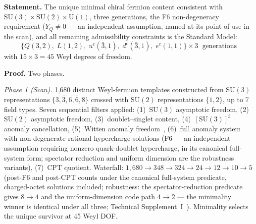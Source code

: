 \documentclass[11pt]{article}
\newcommand{\SU}{\mathrm{SU}}
\newcommand{\U}{\mathrm{U}}
\begin{document}
\begin{tcolorbox}[apfbox, title={Theorem $T_{\mathrm{field}}$ (SM Fermion Content)}]
\textbf{Statement.}  The unique minimal chiral fermion content consistent with $\SU(3) \times \SU(2) \times \U(1)$, three generations, the F6 non-degeneracy requirement ($Y_Q \neq 0$ --- an independent assumption, named at its point of use in the scan), and all remaining admissibility constraints is the Standard Model:
\begin{equation}
\{Q(3,2),\; L(1,2),\; u^c(\bar{3},1),\; d^c(\bar{3},1),\; e^c(1,1)\} \times 3 \;\text{ generations}
\label{eq:fermion_content}
\end{equation}
with $15 \times 3 = 45$ Weyl degrees of freedom.

\smallskip\noindent\textbf{Proof.}  Two phases.

\textit{Phase 1 (Scan).}  1{,}680 distinct Weyl-fermion templates constructed from $\SU(3)$ representations $\{3, \bar{3}, 6, \bar{6}, 8\}$ crossed with $\SU(2)$ representations $\{1, 2\}$, up to 7 field types.  Seven sequential filters applied: (1)~$\SU(3)$ asymptotic freedom, (2)~$\SU(2)$ asymptotic freedom, (3)~doublet--singlet content, (4)~$[\SU(3)]^3$ anomaly cancellation, (5)~Witten anomaly freedom~\cite{Witten1982}, (6)~full anomaly system with non-degenerate rational hypercharge solutions (F6 --- an independent assumption requiring nonzero quark-doublet hypercharge, in its canonical full-system form; spectator reduction and uniform dimension are the robustness variants), (7)~CPT quotient.  Waterfall: $1{,}680 \to 348 \to 324 \to 24 \to 12 \to 10 \to 5$ (post-F6 and post-CPT counts under the canonical full-system predicate, charged-octet solutions included; robustness: the spectator-reduction predicate gives $8 \to 4$ and the uniform-dimension code path $4 \to 2$ --- the minimality winner is identical under all three; Technical Supplement~I~\cite{BrookeP2Supplement}).  Minimality selects the unique survivor at 45 Weyl DOF.


\end{tcolorbox}
\end{document}
